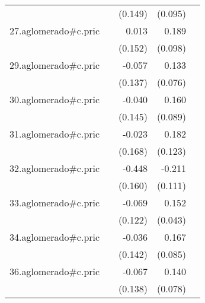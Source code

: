 {\begin{longtable}{l*{4}{D{.}{.}{-1}}}
            &                     &     (0.149)         &     (0.095)         &                     \\
\addlinespace
27.aglomerado#c.pric&                     &       0.013         &       0.189         &                     \\
            &                     &     (0.152)         &     (0.098)         &                     \\
\addlinespace
29.aglomerado#c.pric&                     &      -0.057         &       0.133         &                     \\
            &                     &     (0.137)         &     (0.076)         &                     \\
\addlinespace
30.aglomerado#c.pric&                     &      -0.040         &       0.160         &                     \\
            &                     &     (0.145)         &     (0.089)         &                     \\
\addlinespace
31.aglomerado#c.pric&                     &      -0.023         &       0.182         &                     \\
            &                     &     (0.168)         &     (0.123)         &                     \\
\addlinespace
32.aglomerado#c.pric&                     &      -0.448\sym{**} &      -0.211         &                     \\
            &                     &     (0.160)         &     (0.111)         &                     \\
\addlinespace
33.aglomerado#c.pric&                     &      -0.069         &       0.152\sym{***}&                     \\
            &                     &     (0.122)         &     (0.043)         &                     \\
\addlinespace
34.aglomerado#c.pric&                     &      -0.036         &       0.167\sym{*}  &                     \\
            &                     &     (0.142)         &     (0.085)         &                     \\
\addlinespace
36.aglomerado#c.pric&                     &      -0.067         &       0.140         &                     \\
            &                     &     (0.138)         &     (0.078)         &                     \\

\end{longtable}}

